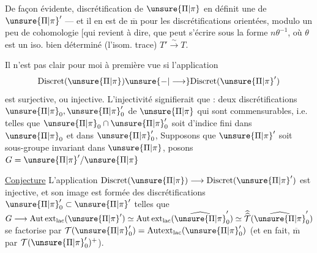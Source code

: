 
De façon évidente,  discrétification de \(\unsure{\Pi|\pi}\)
en définit une de \(\unsure{\Pi|\pi}'\) --- et il en est de
\(\overline{\mathrm m}\) pour les discrétifications orientées, modulo
un peu de cohomologie [qui revient à dire,
que
peut s'écrire sous la forme \(n\theta^{-1}\), où \(\theta\) est un iso. bien
déterminé (l'isom. trace)  \(T'\xrightarrow{\sim}T\).

Il n'est pas clair pour moi à première
vue si l'application
\[
\mathrm{Discret}(\unsure{\Pi|\pi})\unsure{-|\longrightarrow}\mathrm{Discret}(\unsure{\Pi|\pi}')
\]
est surjective, ou injective. L'injectivité
signifierait que : deux discrétifications \(\unsure{\Pi|\pi}_0,\unsure{\Pi|\pi}'_0\) de
\(\unsure{\Pi|\pi}\) qui sont commensurables, i.e. telles que
\(\unsure{\Pi|\pi}_0\cap\unsure{\Pi|\pi}'_0\) soit d'indice fini dans \(\unsure{\Pi|\pi}_0\) et dans \(\unsure{\Pi|\pi}'_0\),
Supposons que \(\unsure{\Pi|\pi}'\) soit sous-groupe invariant
dans \(\unsure{\Pi|\pi}\), posons \(G=\unsure{\Pi|\pi}'/\unsure{\Pi|\pi}\)

\uline{Conjecture} L'application \(\mathrm{Discret}(\unsure{\Pi|\pi})\longrightarrow\mathrm{Discret}(\unsure{\Pi|\pi}')\)
est injective, et son image est formée des
discrétifications \(\unsure{\Pi|\pi}'_0\subset\unsure{\Pi|\pi}'\) telles que
\(G\longrightarrow\mathrm{Aut\,ext}_{\mathrm{lac}}(\unsure{\Pi|\pi}')
\simeq\mathrm{Aut\,ext}_{\mathrm{lac}}(\widehat{\unsure{\Pi|\pi}}'_0)
\simeq\widehat{\widehat{\mathcal T}}(\widehat{\unsure{\Pi|\pi}}'_0)\)
se factorise par \(\mathcal T(\unsure{\Pi|\pi}'_0)=\mathrm{Autext}_{\mathrm{lac}}(\unsure{\Pi|\pi}'_0)\)
(et en fait, \(\overline{\mathrm m}\) par \(\mathcal T(\unsure{\Pi|\pi}'_0)^+\)).

